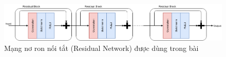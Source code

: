 \begin{figure}[H]
    \centering
    \includegraphics[width=15cm]{./content/materials/residual.png}
    \caption{Mạng nơ ron nối tắt (Residual Network) được dùng trong bài}
    \label{fig:residual_net_in_use}
\end{figure}







